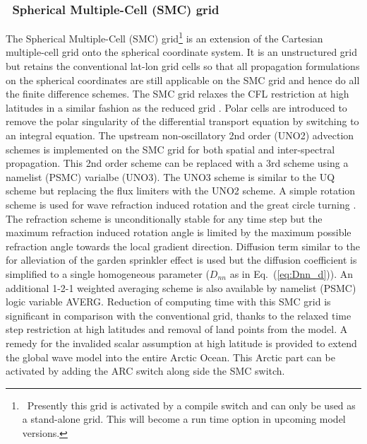 \vssub
\subsubsection{~Spherical Multiple-Cell (SMC) grid} \label{sub:num_space_SMC}

\noindent
The Spherical Multiple-Cell (SMC) grid\footnote{~Presently this grid is
activated by a compile switch and can only be used as a stand-alone grid. This
will become a run time option in upcoming model versions.}  \citep{art:Li11}
is an extension of the Cartesian multiple-cell grid \citep{art:Li03} onto the
spherical coordinate system. It is an unstructured grid but retains the
conventional lat-lon grid cells so that all propagation formulations on the
spherical coordinates are still applicable on the SMC grid and hence do all
the finite difference schemes. The SMC grid relaxes the CFL restriction at
high latitudes in a similar fashion as the reduced grid
\citep{art:RA94}. Polar cells are introduced to remove the polar singularity
of the differential transport equation by switching to an integral
equation. The upstream non-oscillatory 2nd order (UNO2) advection schemes
\citep{art:Li08} is implemented on the SMC grid for both spatial and
inter-spectral propagation. This 2nd order scheme can be replaced with a 3rd 
scheme using a namelist (PSMC) varialbe (UNO3).  The UNO3 scheme is similar to 
the UQ scheme but replacing the flux limiters with the UNO2 scheme.  A simple 
rotation scheme is used for wave refraction induced rotation and the great circle 
turning \citep{art:Li12}.  The refraction scheme is unconditionally stable for 
any time step but the maximum refraction induced rotation angle is limited by 
the maximum possible refraction angle towards the local gradient direction.  
Diffusion term similar to the \cite{art:BH87} for alleviation of the garden 
sprinkler effect is used but the diffusion coefficient is simplified to a single 
homogeneous parameter ($D_{nn}$ as in Eq.~(\ref{eq:Dnn_d})).  An additional 
1-2-1 weighted averaging scheme is also available by namelist (PSMC) logic 
variable AVERG.  Reduction of computing time with this SMC grid is significant 
in comparison with the conventional grid, thanks to the relaxed time step 
restriction at high latitudes and removal of land points from the model.  
A remedy for the invalided scalar assumption at high latitude is provided to 
extend the global wave model into the entire Arctic Ocean.  This Arctic part 
can be activated by adding the ARC switch along side the SMC switch.


